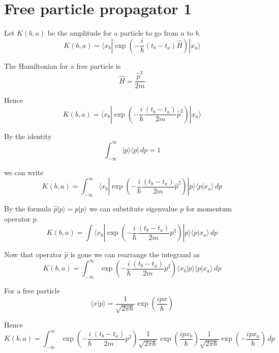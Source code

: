 

\section*{Free particle propagator 1}

Let $K(b,a)$ be the amplitude for a particle to go from $a$ to $b$.
\begin{equation*}
K(b,a)=\langle x_b|\exp\left(-\frac{i}{\hbar}(t_b-t_a)\hat H\right)|x_a\rangle
\end{equation*}

The Hamiltonian for a free particle is
\begin{equation*}
\hat H=\frac{\hat p^2}{2m}
\end{equation*}

Hence
\begin{equation*}
K(b,a)=\langle x_b|\exp\left(-\frac{i}{\hbar}\frac{(t_b-t_a)}{2m}\hat p^2\right)|x_a\rangle
\end{equation*}

By the identity
\begin{equation*}
\int_{-\infty}^\infty|p\rangle\langle p|\,dp=1
\end{equation*}

we can write
\begin{equation*}
K(b,a)=\int_{-\infty}^\infty
\langle x_b|\exp\left(-\frac{i}{\hbar}\frac{(t_b-t_a)}{2m}\hat p^2\right)|p\rangle\langle p|x_a\rangle\,dp
\end{equation*}

By the formula $\hat p|p\rangle=p|p\rangle$ we can
substitute eigenvalue $p$ for momentum operator $\hat p$.
\begin{equation*}
K(b,a)=\int\langle x_b|\exp\left(-\frac{i}{\hbar}\frac{(t_b-t_a)}{2m}p^2\right)
|p\rangle\langle p|x_a\rangle\,dp
\end{equation*}

Now that operator $\hat p$ is gone we can rearrange the integrand as
\begin{equation*}
K(b,a)=\int_{-\infty}^\infty
\exp\left(-\frac{i}{\hbar}\frac{(t_b-t_a)}{2m}p^2\right)\langle x_b|p\rangle\langle p|x_a\rangle\,dp
\end{equation*}

For a free particle
\begin{equation*}
\langle x|p\rangle=\frac{1}{\sqrt{2\pi\hbar}}\exp\left(\frac{ipx}{\hbar}\right)
\end{equation*}

Hence
\begin{equation*}
K(b,a)=\int_{-\infty}^\infty
\exp\left(-\frac{i}{\hbar}\frac{(t_b-t_a)}{2m}p^2\right)
\frac{1}{\sqrt{2\pi\hbar}}\exp\left(\frac{ipx_b}{\hbar}\right)
\frac{1}{\sqrt{2\pi\hbar}}\exp\left(-\frac{ipx_a}{\hbar}\right)\,dp
\end{equation*}

